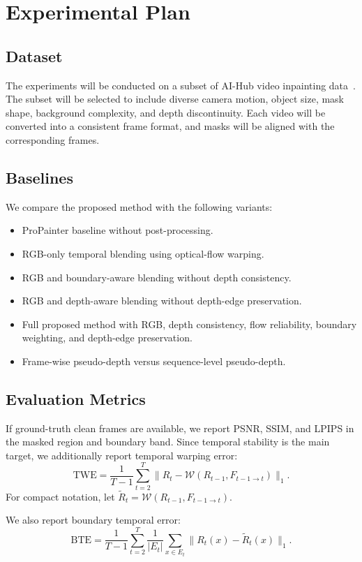 \documentclass[nouppercase]{kaia}
\begin{document}
\section{Experimental Plan}
\subsection{Dataset}
The experiments will be conducted on a subset of AI-Hub video inpainting data~\cite{aihub}. The subset will be selected to include diverse camera motion, object size, mask shape, background complexity, and depth discontinuity. Each video will be converted into a consistent frame format, and masks will be aligned with the corresponding frames.

\subsection{Baselines}
We compare the proposed method with the following variants:
\begin{itemize}
    \item ProPainter baseline without post-processing.
    \item RGB-only temporal blending using optical-flow warping.
    \item RGB and boundary-aware blending without depth consistency.
    \item RGB and depth-aware blending without depth-edge preservation.
    \item Full proposed method with RGB, depth consistency, flow reliability, boundary weighting, and depth-edge preservation.
    \item Frame-wise pseudo-depth versus sequence-level pseudo-depth.
\end{itemize}

\subsection{Evaluation Metrics}
If ground-truth clean frames are available, we report PSNR, SSIM, and LPIPS in the masked region and boundary band. Since temporal stability is the main target, we additionally report temporal warping error:
\begin{equation}
    \text{TWE} = \frac{1}{T-1}\sum_{t=2}^{T}\lVert R_t-\mathcal{W}(R_{t-1}, F_{t-1 \rightarrow t}) \rVert_1.
\end{equation}
For compact notation, let $\widetilde{R}_t=\mathcal{W}(R_{t-1}, F_{t-1 \rightarrow t})$.

We also report boundary temporal error:
\begin{equation}
    \text{BTE} =
    \frac{1}{T-1}\sum_{t=2}^{T} \frac{1}{|E_t|}
    \sum_{x \in E_t}\lVert R_t(x)-\widetilde{R}_t(x) \rVert_1.
\end{equation}
\end{document}
